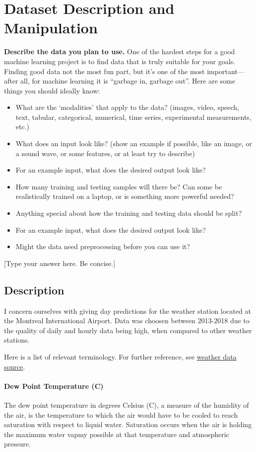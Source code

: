 \documentclass[a4paper,11pt]{article}
\begin{document}
\section{Dataset Description and Manipulation}
\textbf{Describe the data you plan to use.} One of the hardest steps for a good machine learning project is to find data that is truly suitable for your goals. Finding good data not the most fun part, but it’s one of the most important—after all, for machine learning it is “garbage in, garbage out”. Here are some things you should ideally know:
\begin{itemize}
  \item What are the ‘modalities’ that apply to the data? (images, video, speech, text, tabular, categorical, numerical, time series, experimental measurements, etc.)
  \item What does an input look like? (show an example if possible, like an image, or a sound wave, or some features, or at least try to describe)
  \item  For an example input, what does the desired output look like?
  \item   How many training and testing samples will there be? Can some be realistically trained on a laptop, or is something more powerful needed?
  \item  Anything special about how the training and testing data should be split?
  \item  For an example input, what does the desired output look like?
  \item  Might the data need preprocessing before you can use it?
\end{itemize}
[Type your answer here. Be concise.]

\subsection{Description}
I concern ourselves with giving day predictions for the weather station located at the Montreal International Airport. Data was choosen between 2013-2018 due to the quality of daily and hourly data being high, when compared to other weather stations. \par

Here is a list of relevant terminology. For further reference, see \href{https://climate.weather.gc.ca/historical_data/search_historic_data_e.html}{weather data source}.

\paragraph{Dew Point Temperature (C)}
The dew point temperature in degrees Celsius (C), a measure of the humidity of the air, is the temperature to which the air would have to be cooled to reach saturation with respect to liquid water. Saturation occurs when the air is holding the maximum water vapmy possible at that temperature and atmospheric pressure.
\end{document}
